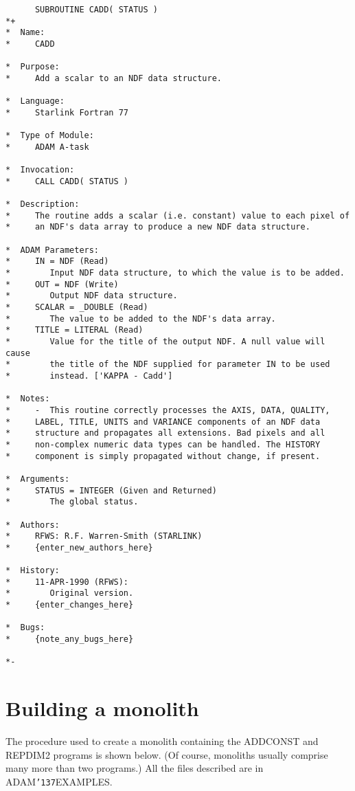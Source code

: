 \documentclass[twoside,11pt]{article}
\renewcommand{\_}{{\tt\char'137}}
\newcommand{\xlabel}[1]{}
\begin{document}
\newpage
\begin{verbatim}
      SUBROUTINE CADD( STATUS )
*+
*  Name:
*     CADD

*  Purpose:
*     Add a scalar to an NDF data structure.

*  Language:
*     Starlink Fortran 77

*  Type of Module:
*     ADAM A-task

*  Invocation:
*     CALL CADD( STATUS )

*  Description:
*     The routine adds a scalar (i.e. constant) value to each pixel of
*     an NDF's data array to produce a new NDF data structure.

*  ADAM Parameters:
*     IN = NDF (Read)
*        Input NDF data structure, to which the value is to be added.
*     OUT = NDF (Write)
*        Output NDF data structure.
*     SCALAR = _DOUBLE (Read)
*        The value to be added to the NDF's data array.
*     TITLE = LITERAL (Read)
*        Value for the title of the output NDF. A null value will cause
*        the title of the NDF supplied for parameter IN to be used
*        instead. ['KAPPA - Cadd']

*  Notes:
*     -  This routine correctly processes the AXIS, DATA, QUALITY,
*     LABEL, TITLE, UNITS and VARIANCE components of an NDF data
*     structure and propagates all extensions. Bad pixels and all
*     non-complex numeric data types can be handled. The HISTORY 
*     component is simply propagated without change, if present.

*  Arguments:
*     STATUS = INTEGER (Given and Returned)
*        The global status.

*  Authors:
*     RFWS: R.F. Warren-Smith (STARLINK)
*     {enter_new_authors_here}

*  History:
*     11-APR-1990 (RFWS):
*        Original version.
*     {enter_changes_here}

*  Bugs:
*     {note_any_bugs_here}

*-
\end{verbatim}

\newpage
\section{Building a monolith\label{monolith}\xlabel{building_a_monolith}}

The procedure used to create a monolith containing the ADDCONST and REPDIM2 
programs is shown below.
(Of course, monoliths usually comprise many more than two programs.)
All the files described are in ADAM\_EXAMPLES.
\end{document}
